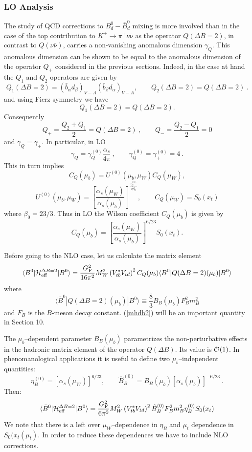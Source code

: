 \documentclass[12pt]{article}
\def\as{\alpha_s}
\newcommand{\be}{\begin{equation}}
\newcommand{\ee}{\end{equation}}
\newcommand{\ord}{{\cal O}}
\newcommand{\f}{\frac}
\begin{document}
\begin{itemize}
\begin{itemize}
\subsubsection{LO Analysis}
The study of QCD corrections to 
$B^0_d-\bar B^0_d$ mixing  is more involved 
than in the case of the top contribution to $K^+\to\pi^+\nu\bar\nu$
as
the operator $Q(\Delta B=2)$, in contrast to $Q(\nu\bar\nu)$, carries
a non-vanishing anomalous dimension $\gamma_Q$. This anomalous dimension
can be shown to be equal to the anomalous dimension of the operator
$Q_+$ considered in the previous sections. Indeed, in the case at hand
the $Q_1$ and $Q_2$ operators are given by
\be
Q_1(\Delta B=2)=(\bar b_\alpha d_\beta)_{V-A}(\bar b_\beta d_\alpha)_{V-A},
\quad\quad
Q_2(\Delta B=2)=Q(\Delta B=2)~.
\ee
and using Fierz symmetry we have
\be
Q_1(\Delta B=2)=Q(\Delta B=2).
\ee
Consequently
\be
Q_+=\frac{Q_2+Q_1}{2}=Q(\Delta B=2)~,
\qquad
Q_-=\frac{Q_2-Q_1}{2}=0  
\ee 
and $\gamma_Q=\gamma_+$. In particular, in LO
\begin{equation}\label{gamq0}
\gamma_Q=\gamma_Q^{(0)}\frac{\as}{4\pi}~,
\qquad
\gamma_Q^{(0)}=
\gamma_+^{(0)}=4~.
\end{equation}
This in turn implies
\be
C_Q(\mu_b)=U^{(0)}(\mu_b,\mu_W) C_Q(\mu_W),
\ee
\be
U^{(0)}(\mu_b,\mu_W)=
\left[\f{\as(\mu_W)}{\as(\mu_b)}\right]^{\f{\gamma_Q^{(0)}}{2\beta_0}},
\qquad
C_Q(\mu_W)=S_0(x_t)
\ee
where $\beta_0=23/3$.
Thus in LO the Wilson coefficient $C_Q(\mu_b)$ is given by
\be
C_Q(\mu_b)=\left[\f{\as(\mu_W)}{\as(\mu_b)}\right]^{6/23} S_0(x_t).
\ee

Before going to the NLO case, let us calculate the matrix element
\begin{equation}\label{mhdb2}
\langle \bar B^0|{\cal H}^{\Delta B=2}_{\rm eff}|B^0\rangle
=\frac{G^2_{\rm F}}{16\pi^2}M^2_W
 \left(V^\ast_{tb}V_{td}\right)^2 
 C_Q(\mu_b) \langle \bar B^0|Q(\Delta B=2)(\mu_b) |B^0\rangle
\end{equation}
where
\begin{equation}
\langle \bar B^0|Q(\Delta B=2)(\mu_b)|B^0\rangle
\equiv \frac{8}{3} B_{B}(\mu_b) F_{B}^2 m_{B}^2
\label{eq:BbarB0}
\end{equation}
and $F_{B}$ is the $B$-meson decay constant. (\ref{mhdb2}) will be an 
important quantity in Section 10.

The $\mu_b$--dependent parameter $B_B(\mu_b)$ parametrizes 
the non-perturbative effects in the hadronic matrix element of the
operator $Q(\Delta B)$. Its value is $\ord(1)$. In phenomanological
applications it is useful to define two
$\mu_b$--independent quantities:
\be
\eta^{(0)}_B=\left[\as(\mu_W)\right]^{6/23},
\qquad
\hat B^{(0)}_{B} = B_{B}(\mu_b) \left[ \as(\mu_b) \right]^{-6/23}~.
\ee
Then:
\begin{equation}\label{mhdb3}
\langle \bar B^0|{\cal H}^{\Delta B=2}_{\rm eff}|B^0\rangle
=\frac{G^2_{\rm F}}{6\pi^2}M^2_W
 \left(V^\ast_{tb}V_{td}\right)^2 
 \hat B^{(0)}_B F^2_B m_B^2\eta^{(0)}_B S_0(x_t)
\end{equation}
We note that there is a left over $\mu_W$--dependence in $\eta_B$ and
$\mu_t$ dependence in $S_0(x_t(\mu_t)$. In order to reduce these dependences
we have to include NLO corrections.


\end{itemize}
\end{itemize}
\end{document}
